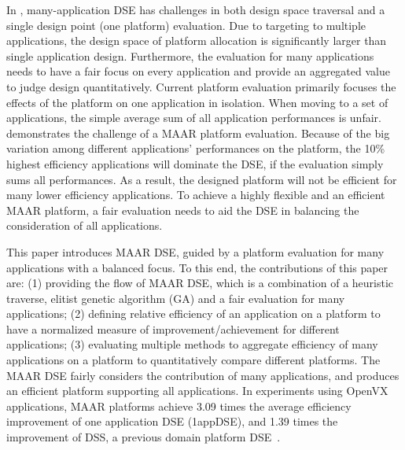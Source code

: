 
In , many-application DSE has challenges in both design space traversal and a single design point (one platform) evaluation. Due to targeting to multiple applications, the design space of platform allocation is significantly larger than single application design. Furthermore, the evaluation for many applications needs to have a fair focus on every application and provide an aggregated value to judge design quantitatively. Current platform evaluation primarily focuses the effects of the platform on one application in isolation. When moving to a set of applications, the simple average sum of all application performances is unfair.  demonstrates the challenge of a MAAR platform evaluation. Because of the big variation among different applications' performances on the platform, the 10\% highest efficiency applications will dominate the DSE, if the evaluation simply sums all performances. As a result, the designed platform will not be efficient for many lower efficiency applications. To achieve a highly flexible and an efficient MAAR platform, a fair evaluation needs to aid the DSE in balancing the consideration of all applications.




This paper introduces MAAR DSE, guided by a platform evaluation for many applications with a balanced focus. To this end, the contributions of this paper are: (1) providing the flow of MAAR DSE, which is a combination of a heuristic traverse, elitist genetic algorithm (GA) and a fair evaluation for many applications; (2) defining relative efficiency of an application on a platform to have a normalized measure of improvement/achievement for different applications; (3) evaluating multiple methods to aggregate efficiency of many applications on a platform to quantitatively compare different platforms. The MAAR DSE fairly considers the contribution of many applications, and produces an efficient platform supporting all applications. In experiments using OpenVX applications, MAAR platforms achieve 3.09 times the average efficiency improvement of one application DSE (1appDSE), and 1.39 times the improvement of DSS, a previous domain platform DSE~\cite{zhang2018ds}. 

